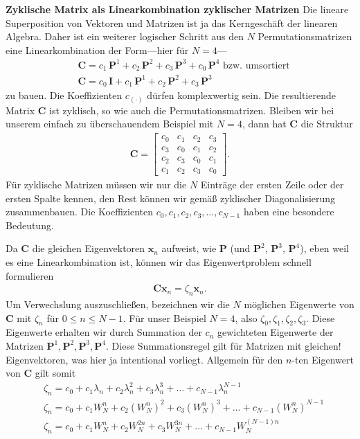 \textbf{Zyklische Matrix als Linearkombination zyklischer Matrizen}
Die lineare Superposition von Vektoren und Matrizen ist ja das Kerngeschäft
der linearen Algebra.
Daher ist ein weiterer logischer Schritt aus den $N$
Permutationsmatrizen eine Linearkombination der Form---hier für $N=4$---
\begin{align}
&\bm{C} = c_1 \, \bm{P}^1 + c_2 \, \bm{P}^2 + c_3 \, \bm{P}^3 + c_0 \, \bm{P}^4\text{ bzw. umsortiert}\nonumber\\
&\bm{C} = c_0 \, \bm{I} + c_1 \, \bm{P}^1 + c_2 \, \bm{P}^2 + c_3 \, \bm{P}^3
\end{align}
zu bauen.
Die Koeffizienten $c_{(\cdot)}$ dürfen komplexwertig sein. Die resultierende
Matrix $\bm{C}$ ist zyklisch, so wie auch die Permutationsmatrizen.
Bleiben wir bei unserem einfach zu überschauendem Beispiel mit $N=4$, dann hat
$\bm{C}$ die Struktur
%
\begin{align}
\bm{C}=
\begin{bmatrix}
c_0& c_1& c_2& c_3\\
c_3& c_0& c_1& c_2\\
c_2& c_3& c_0& c_1\\
c_1& c_2& c_3& c_0
\end{bmatrix}.
\end{align}
Für zyklische Matrizen müssen wir nur die $N$ Einträge der ersten Zeile oder der ersten Spalte kennen,
den Rest können wir gemäß zyklischer Diagonalisierung zusammenbauen.
Die Koeffizienten $c_0,c_1, c_2, c_3,\dots, c_{N-1}$
haben eine besondere Bedeutung.

Da $\bm{C}$ die gleichen Eigenvektoren $\bm{x}_n$ aufweist, wie $\bm{P}$
(und $\bm{P}^2$, $\bm{P}^3$, $\bm{P}^4$), eben weil es eine Linearkombination
ist, können wir das Eigenwertproblem schnell formulieren
\begin{align}
\bm{C} \bm{x}_n = \zeta_n \bm{x}_n.
\end{align}
Um Verwechslung auszuschließen, bezeichnen wir die $N$ möglichen
Eigenwerte von $\bm{C}$ mit $\zeta_n$ für $0\leq n \leq N-1$.
%
Für unser Beispiel $N=4$, also $\zeta_0, \zeta_1, \zeta_2, \zeta_3$.
%
Diese Eigenwerte erhalten wir durch Summation der $c_n$ gewichteten Eigenwerte
der Matrizen $\bm{P}^1, \bm{P}^2, \bm{P}^3, \bm{P}^4$.
Diese Summationsregel gilt für Matrizen mit gleichen! Eigenvektoren, was hier
ja intentional vorliegt. Allgemein für den $n$-ten Eigenwert von $\bm{C}$
gilt somit
\begin{align}
&\zeta_n = c_0 + c_1 \lambda_n + c_2 \lambda_n^2 + c_3 \lambda_n^3 + \dots + c_{N-1} \lambda_n^{N-1}\\
&\zeta_n = c_0 + c_1 W_N^n + c_2 (W_N^n)^2 + c_3 (W_N^n)^3 + \dots + c_{N-1} (W_N^n)^{N-1}\\
&\zeta_n = c_0 + c_1 W_N^n + c_2 W_N^{2n} + c_3 W_N^{3n} + \dots + c_{N-1} W_N^{(N-1) n}
\end{align}

